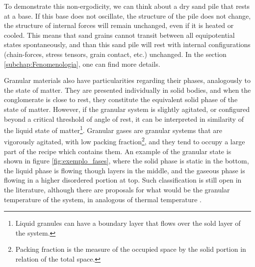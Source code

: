     To demonstrate this non-ergodicity, we can think about a dry sand pile that rests at a base. If this base does not oscillate, the structure of the pile does not change, the structure of internal forces will remain unchanged, even if it is heated or cooled. This means that sand grains cannot transit between all equipotential states spontaneously, and than this sand pile will rest with internal configurations (chain-forces, stress tensors, grain contact, etc.) unchanged. In the section \ref{subchap:Fenomenologia}, one can find more details.


    Granular materials also have particularities regarding their phases, analogously to the state of matter. They are presented individually in solid bodies, and when the conglomerate is close to rest, they constitute the equivalent solid phase of the state of matter. However, if the granular system is slightly agitated, or configured beyond a critical threshold of angle of rest, it can be interpreted in similarity of the liquid state of matter\footnote{Liquid granules can have a boundary layer that flows over the sold layer of the system.}. Granular gases are granular systems that are vigorously agitated, with low packing fraction\footnote{Packing fraction is the measure of the occupied space by the solid portion in relation of the total space.}, and they tend to occupy a large part of the recipe which contains them. An example of the granular state is shown in figure \ref{fig:exemplo_fases}, where the solid phase is static in the bottom, the liquid phase is flowing though layers in the middle, and the gaseous phase is flowing in a higher disordered portion at top. Such classification is still open in the literature, although there are proposals for what would be the granular temperature of the system, in analogous of thermal temperature \cite{Granular_Solids_Liquids_and_Gases}.

